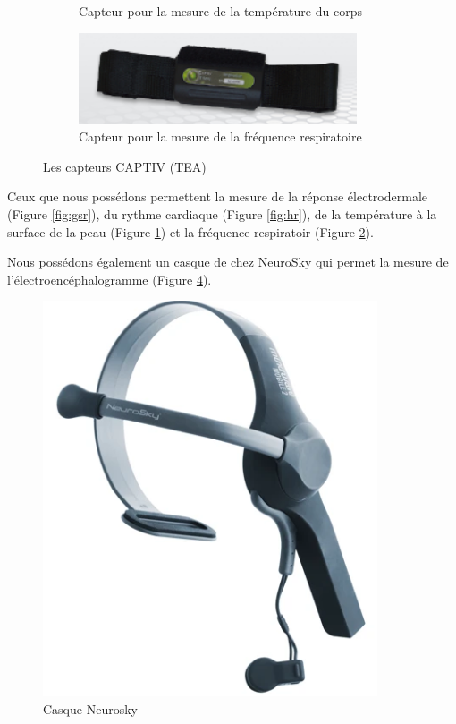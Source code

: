\documentclass{article}
\begin{document}
\begin{figure}
\begin{subfigure}{0.5\textwidth}
					\caption{Capteur pour la mesure de la température du corps}
					\label{fig:bt}
				\end{subfigure}
				\begin{subfigure}{0.5\textwidth}
					\centering
					\includegraphics[scale=0.5]{../include/TEArr.PNG}
					\caption{Capteur pour la mesure de la fréquence respiratoire}
					\label{fig:rr}
				\end{subfigure}
				\caption{Les capteurs CAPTIV (TEA)}
				\label{fig:capteurstea}
			\end{figure}
			Ceux que nous possédons permettent la mesure de la réponse électrodermale (Figure \ref{fig:gsr}), du rythme cardiaque (Figure \ref{fig:hr}), de la température à la surface de la peau (Figure \ref{fig:bt}) et la fréquence respiratoir (Figure \ref{fig:rr}).\par
			Nous possédons également un casque de chez NeuroSky qui permet la mesure de l'électroencéphalogramme (Figure \ref{fig:neurosky}).
			\begin{figure}
				\centering
				\includegraphics[scale=0.5]{../include/neurosky.PNG}
				\caption{Casque Neurosky}
				\label{fig:neurosky}
			\end{figure}
\end{document}
